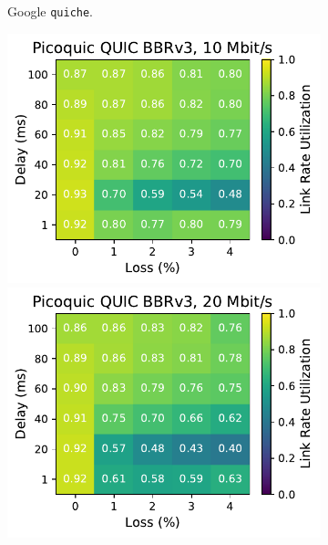 \begin{figure}[ht]
\begin{subfigure}[b]{0.22\linewidth}
        \caption{Google \texttt{quiche}.}
    \end{subfigure}
    \begin{subfigure}[b]{0.22\linewidth}
        \includegraphics[width=\linewidth,trim={0 0 2cm 0},clip]{figures/heatmaps/heatmap_picoquic_bbr3_10mbps.pdf}
        \includegraphics[width=\linewidth,trim={0 0 2cm 0},clip]{figures/heatmaps/heatmap_picoquic_bbr3_20mbps.pdf}

\end{subfigure}
\end{figure}
